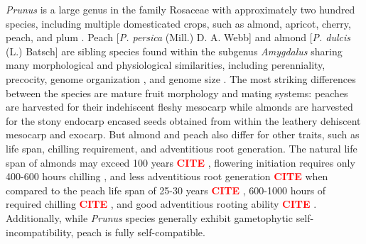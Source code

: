 \documentclass[12pt]{article}
\newcommand{\citex}{\textcolor{red}{\bf CITE }}
\begin{document}
\emph{Prunus} is a large genus in the family Rosaceae with approximately two hundred species, including multiple domesticated crops, such as almond, apricot, cherry, peach, and plum \citep{rehder1940manual}.
%
Peach [\emph{P. persica} (Mill.) D. A. Webb] and almond [\emph{P. dulcis} (L.) Batsch] are sibling species found within the subgenus \emph{Amygdalus} sharing many morphological and physiological similarities, including perenniality, precocity, genome organization \citep{arus2012peach}, and genome size \citep{baird1994estimating}. 
%
The most striking differences between the species are mature fruit morphology and mating systems: peaches are harvested for their indehiscent fleshy mesocarp while almonds are harvested for the stony endocarp encased seeds obtained from within the leathery dehiscent mesocarp and exocarp. 
%
But almond and peach also differ for other traits, such as life span, chilling requirement, and adventitious root generation.
%
The natural life span of almonds may exceed 100 years \citex,
flowering initiation requires only 400-600 hours chilling \citep{alonso2005determination}, %
and less adventitious root generation \citex when compared to the peach life span of 25-30 years \citex, %
600-1000 hours of required chilling \citex, %
and good adventitious rooting ability \citex. 
%
Additionally, while \emph{Prunus} species generally exhibit gametophytic self-incompatibility, peach is fully self-compatible.
\end{document}
